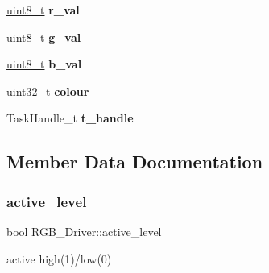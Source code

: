 \begin{DoxyCompactItemize}
\item 
\mbox{\label{structRGB__Driver_aa07486be8ddf6e6b94681f8422bd7119}} 
\hyperlink{vl53l0x__types_8h_aba7bc1797add20fe3efdf37ced1182c5}{uint8\+\_\+t} {\bfseries r\+\_\+val}
\item 
\mbox{\label{structRGB__Driver_a5e566b01cae790c03581d65e53399339}} 
\hyperlink{vl53l0x__types_8h_aba7bc1797add20fe3efdf37ced1182c5}{uint8\+\_\+t} {\bfseries g\+\_\+val}
\item 
\mbox{\label{structRGB__Driver_a9d30d72e88f462b2ae983cc2e04e79e1}} 
\hyperlink{vl53l0x__types_8h_aba7bc1797add20fe3efdf37ced1182c5}{uint8\+\_\+t} {\bfseries b\+\_\+val}
\item 
\mbox{\label{structRGB__Driver_ac431da42eec1c0fb151f451ff73c41d3}} 
\hyperlink{vl53l0x__types_8h_a435d1572bf3f880d55459d9805097f62}{uint32\+\_\+t} {\bfseries colour}
\item 
\mbox{\label{structRGB__Driver_aae5f80a46e262954e3f13659da1e3a70}} 
Task\+Handle\+\_\+t {\bfseries t\+\_\+handle}
\end{DoxyCompactItemize}


\subsection{Member Data Documentation}
\mbox{\label{structRGB__Driver_a37da49d052a49bd9e57357bdab8c0591}} 
\subsubsection{\texorpdfstring{active\+\_\+level}{active\_level}}
{\footnotesize\ttfamily bool R\+G\+B\+\_\+\+Driver\+::active\+\_\+level}

active high(1)/low(0) \mbox{\label{structRGB__Driver_a2ce6a8d15b7a1411f68cd26c67e8cd4a}} 

